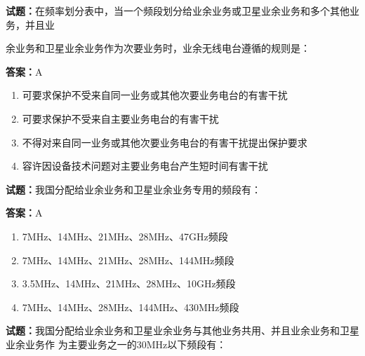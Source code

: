 \documentclass{ctexbook}
\begin{document}
\vspace{1em}

\textbf{试题：}在频率划分表中，当一个频段划分给业余业务或卫星业余业务和多个其他业务，并且业


余业务和卫星业余业务作为次要业务时，业余无线电台遵循的规则是： 

\textbf{答案：}A 

\begin{enumerate}[leftmargin=3em]
  \item 可要求保护不受来自同一业务或其他次要业务电台的有害干扰 

  \item 可要求保护不受来自主要业务电台的有害干扰 

  \item 不得对来自同一业务或其他次要业务电台的有害干扰提出保护要求 

  \item 容许因设备技术问题对主要业务电台产生短时间有害干扰 

\end{enumerate}





\vspace{1em}

\textbf{试题：}我国分配给业余业务和卫星业余业务专用的频段有： 

\textbf{答案：}A 

\begin{enumerate}[leftmargin=3em]
  \item 7MHz、14MHz、21MHz、28MHz、47GHz频段 

  \item 7MHz、14MHz、21MHz、28MHz、144MHz频段 

  \item 3.5MHz、14MHz、21MHz、28MHz、10GHz频段 

  \item 7MHz、14MHz、28MHz、144MHz、430MHz频段 

\end{enumerate}





\vspace{1em}

\textbf{试题：}我国分配给业余业务和卫星业余业务与其他业务共用、并且业余业务和卫星业余业务作
为主要业务之一的30MHz以下频段有： 
\end{document}

